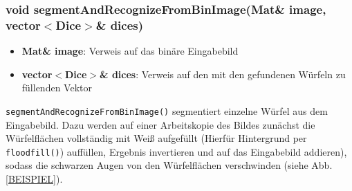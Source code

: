 \documentclass{../Vorlage/sebDenCls}
\begin{document}
\subsubsection{void segmentAndRecognizeFromBinImage(Mat\& image, vector$<$Dice$>$\& dices)}
\begin{itemize}
	\item \textbf{Mat\& image}: Verweis auf das binäre Eingabebild
	\item \textbf{vector$<$Dice$>$\& dices}: Verweis auf den mit den gefundenen Würfeln zu füllenden Vektor
\end{itemize}


\texttt{segmentAndRecognizeFromBinImage()} segmentiert einzelne Würfel aus dem Eingabebild. Dazu werden auf einer Arbeitskopie des Bildes zunächst die Würfelflächen vollständig mit Weiß aufgefüllt (Hierfür Hintergrund per \texttt{floodfill()}) auffüllen, Ergebnis invertieren und auf das Eingabebild addieren), sodass die schwarzen Augen von den Würfelflächen verschwinden (siehe Abb. \ref{BEISPIEL}). 
\end{document}
